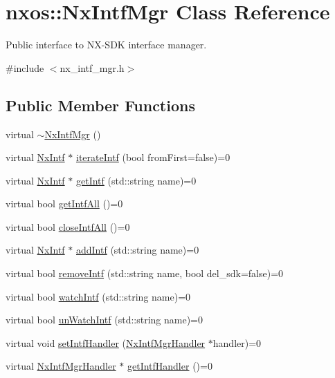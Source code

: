\hypertarget{classnxos_1_1_nx_intf_mgr}{}\section{nxos\+:\+:Nx\+Intf\+Mgr Class Reference}
\label{classnxos_1_1_nx_intf_mgr}


Public interface to N\+X-\/\+S\+DK interface manager.  




{\ttfamily \#include $<$nx\+\_\+intf\+\_\+mgr.\+h$>$}

\subsection*{Public Member Functions}
\begin{DoxyCompactItemize}
\item 
virtual \mbox{\hyperlink{classnxos_1_1_nx_intf_mgr_a15014eefb460c6f52cb0244de4b03355}{$\sim$\+Nx\+Intf\+Mgr}} ()
\item 
virtual \mbox{\hyperlink{classnxos_1_1_nx_intf}{Nx\+Intf}} $\ast$ \mbox{\hyperlink{classnxos_1_1_nx_intf_mgr_acbe3d94cba5b7982d80cc498d7fcbdf7}{iterate\+Intf}} (bool from\+First=false)=0
\item 
virtual \mbox{\hyperlink{classnxos_1_1_nx_intf}{Nx\+Intf}} $\ast$ \mbox{\hyperlink{classnxos_1_1_nx_intf_mgr_a1271144b1921be0dcb27a6aa7310bbc5}{get\+Intf}} (std\+::string name)=0
\item 
virtual bool \mbox{\hyperlink{classnxos_1_1_nx_intf_mgr_af70ee700e633a9f5ae35608d7637ee04}{get\+Intf\+All}} ()=0
\item 
virtual bool \mbox{\hyperlink{classnxos_1_1_nx_intf_mgr_a45e7cb2a8e3919667c14264dd618168a}{close\+Intf\+All}} ()=0
\item 
virtual \mbox{\hyperlink{classnxos_1_1_nx_intf}{Nx\+Intf}} $\ast$ \mbox{\hyperlink{classnxos_1_1_nx_intf_mgr_a818e4d019413e8111cbb9610e465f714}{add\+Intf}} (std\+::string name)=0
\item 
virtual bool \mbox{\hyperlink{classnxos_1_1_nx_intf_mgr_a89ab4d3bcc05b6c2d938ebd969454306}{remove\+Intf}} (std\+::string name, bool del\+\_\+sdk=false)=0
\item 
virtual bool \mbox{\hyperlink{classnxos_1_1_nx_intf_mgr_aa07fd4d582d52a9aac7a2efd88675bfc}{watch\+Intf}} (std\+::string name)=0
\item 
virtual bool \mbox{\hyperlink{classnxos_1_1_nx_intf_mgr_a325eed4d08efc01fca1993148911a21a}{un\+Watch\+Intf}} (std\+::string name)=0
\item 
virtual void \mbox{\hyperlink{classnxos_1_1_nx_intf_mgr_a9a8927131c8edd906ff035a2bbbe0eb0}{set\+Intf\+Handler}} (\mbox{\hyperlink{classnxos_1_1_nx_intf_mgr_handler}{Nx\+Intf\+Mgr\+Handler}} $\ast$handler)=0
\item 
virtual \mbox{\hyperlink{classnxos_1_1_nx_intf_mgr_handler}{Nx\+Intf\+Mgr\+Handler}} $\ast$ \mbox{\hyperlink{classnxos_1_1_nx_intf_mgr_af3fff8d1738bc43b2441a8b868984665}{get\+Intf\+Handler}} ()=0
\end{DoxyCompactItemize}


